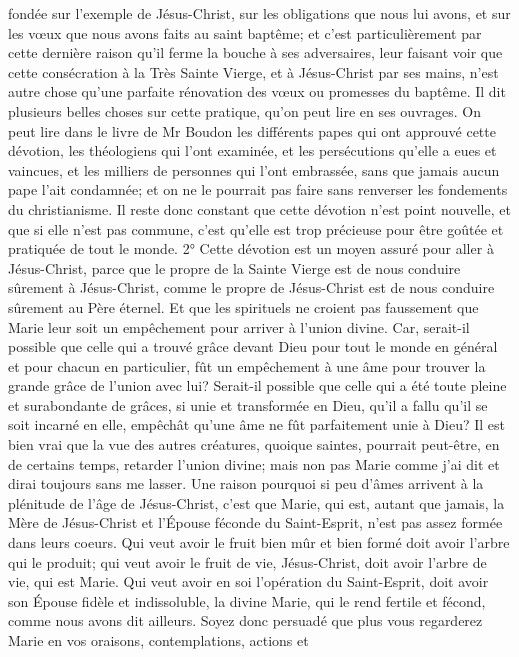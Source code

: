fondée sur l'exemple de Jésus-Christ, sur les obligations que nous lui avons, et sur les vœux que nous avons faits
au saint baptême; et c'est particulièrement par cette dernière raison qu'il ferme la bouche à ses adversaires, leur
faisant voir que cette consécration à la Très Sainte Vierge, et à Jésus-Christ par ses mains, n'est autre chose
qu'une parfaite rénovation des vœux ou promesses du baptême. Il dit plusieurs belles choses sur cette pratique,
qu'on peut lire en ses ouvrages.
 On peut lire dans le livre de Mr Boudon les différents papes qui ont approuvé cette dévotion, les théologiens
qui l'ont examinée, et les persécutions qu'elle a eues et vaincues, et les milliers de personnes qui l'ont embrassée,
sans que jamais aucun pape l'ait condamnée; et on ne le pourrait pas faire sans renverser les fondements du
christianisme. Il reste donc constant que cette dévotion n'est point nouvelle, et que si elle n'est pas commune, c'est
qu'elle est trop précieuse pour être goûtée et pratiquée de tout le monde.
 2° Cette dévotion est un moyen assuré pour aller à Jésus-Christ, parce que le propre de la Sainte Vierge est
de nous conduire sûrement à Jésus-Christ, comme le propre de Jésus-Christ est de nous conduire sûrement au
Père éternel. Et que les spirituels ne croient pas faussement que Marie leur soit un empêchement pour arriver à
l'union divine. Car, serait-il possible que celle qui a trouvé grâce devant Dieu pour tout le monde en général et pour
chacun en particulier, fût un empêchement à une âme pour trouver la grande grâce de l'union avec lui? Serait-il
possible que celle qui a été toute pleine et surabondante de grâces, si unie et transformée en Dieu, qu'il a fallu qu'il
se soit incarné en elle, empêchât qu'une âme ne fût parfaitement unie à Dieu?
Il est bien vrai que la vue des autres créatures, quoique saintes, pourrait peut-être, en de certains temps, retarder
l'union divine; mais non pas Marie comme j'ai dit et dirai toujours sans me lasser. Une raison pourquoi si peu
d'âmes arrivent à la plénitude de l'âge de Jésus-Christ, c'est que Marie, qui est, autant que jamais, la Mère de
Jésus-Christ et l'Épouse féconde du Saint-Esprit, n'est pas assez formée dans leurs coeurs. Qui veut avoir le fruit
bien mûr et bien formé doit avoir l'arbre qui le produit; qui veut avoir le fruit de vie, Jésus-Christ, doit avoir l'arbre
de vie, qui est Marie. Qui veut avoir en soi l'opération du Saint-Esprit, doit avoir son Épouse fidèle et indissoluble,
la divine Marie, qui le rend fertile et fécond, comme nous avons dit ailleurs.
 Soyez donc persuadé que plus vous regarderez Marie en vos oraisons, contemplations, actions et

